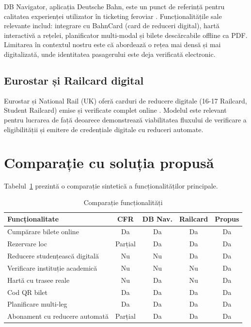 \documentclass[12pt,a4paper]{report}
\begin{document}
DB Navigator, aplicația Deutsche Bahn, este un punct de referință pentru calitatea experienței utilizator în ticketing feroviar \cite{db2023digital}. Funcționalitățile sale relevante includ: integrare cu BahnCard (card de reduceri digital), hartă interactivă a rețelei, planificator multi-modal și bilete descărcabile offline ca PDF. Limitarea în contextul nostru este că abordează o rețea mai densă și mai digitalizată, unde identitatea pasagerului este deja verificată electronic.

\subsection{Eurostar și Railcard digital}

Eurostar și National Rail (UK) oferă carduri de reducere digitale (16-17 Railcard, Student Railcard) emise și verificate complet online \cite{nationalrail2022}. Modelul este relevant pentru lucrarea de față deoarece demonstrează viabilitatea fluxului de verificare a eligibilității și emitere de credențiale digitale cu reduceri automate.

\section{Comparație cu soluția propusă}

Tabelul~\ref{tab:comparison} prezintă o comparație sintetică a funcționalităților principale.

\begin{table}[ht]\small\linespread{1}
\caption{Comparație funcționalități}
\label{tab:comparison}
\begin{tabular}{l c c c c}
\textbf{Funcționalitate} & \textbf{CFR} & \textbf{DB Nav.} & \textbf{Railcard} & \textbf{Propus} \\\hline
Cumpărare bilete online & Da & Da & Da & Da \\
Rezervare loc & Parțial & Da & Da & Da \\
Reducere studențească digitală & Nu & Nu & Da & Da \\
Verificare instituție academică & Nu & Nu & Nu & Da \\
Hartă cu trasee reale & Nu & Da & Nu & Da \\
Cod QR bilet & Da & Da & Da & Da \\
Planificare multi-leg & Da & Da & Da & Da \\
Abonament cu reducere automată & Parțial & Da & Da & Da \\
\hline
\end{tabular}
\end{table}
\end{document}

